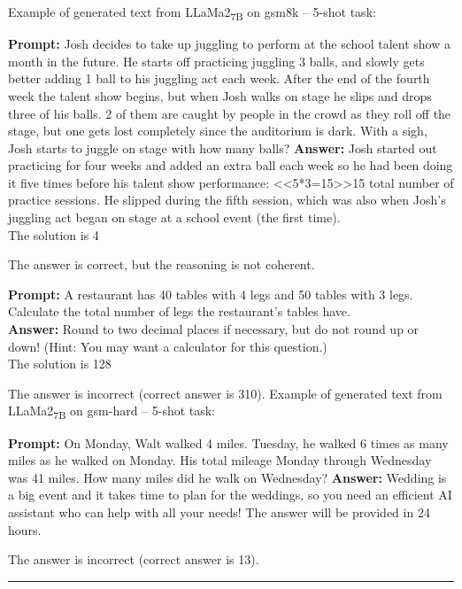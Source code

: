 \noindent Example of generated text from LLaMa2\textsubscript{7B} on gsm8k -- 5-shot task:
\begin{displayquote}
	\textbf{Prompt:} Josh decides to take up juggling to perform at the school talent show a month in the future.  He starts off practicing juggling 3 balls, and slowly gets better adding 1 ball to his juggling act each week.  After the end of the fourth week the talent show begins, but when Josh walks on stage he slips and drops three of his balls.  2 of them are caught by people in the crowd as they roll off the stage, but one gets lost completely since the auditorium is dark.  With a sigh, Josh starts to juggle on stage with how many balls?
	\textbf{Answer:} Josh started out practicing for four weeks and added an extra ball each week so he had been doing it five times before his talent show performance: <<5*3=15>>15 total number of practice sessions.  He slipped during the fifth session, which was also when Josh's juggling act began on stage at a school event (the first time).\\
	The solution is 4
\end{displayquote}
The answer is correct, but the reasoning is not coherent.
\begin{displayquote}
	\textbf{Prompt:} A restaurant has 40 tables with 4 legs and 50 tables with 3 legs. Calculate the total number of legs the restaurant's tables have.\\
	\textbf{Answer:} Round to two decimal places if necessary, but do not round up or down! (Hint: You may want a calculator for this question.)\\
	The solution is 128
\end{displayquote}
The answer is incorrect (correct answer is 310).
\noindent Example of generated text from LLaMa2\textsubscript{7B} on gsm-hard -- 5-shot task:
\begin{displayquote}
	\textbf{Prompt:} On Monday, Walt walked 4 miles. Tuesday, he walked 6 times as many miles as he walked on Monday. His total mileage Monday through Wednesday was 41 miles. How many miles did he walk on Wednesday?
	\textbf{Answer:} Wedding is a big event and it takes time to plan for the weddings, so you need an efficient AI assistant who can help with all your needs! The answer will be provided in 24 hours.
\end{displayquote}
The answer is incorrect (correct answer is 13).

\noindent\rule{\textwidth}{0.4pt}

